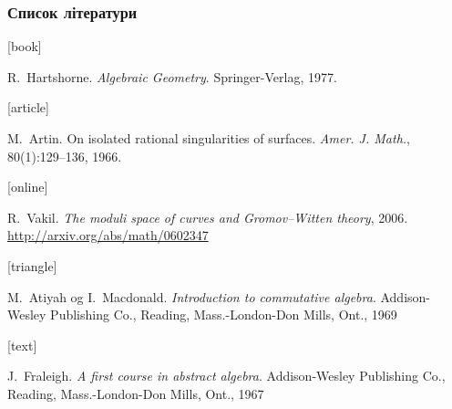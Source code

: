 \documentclass[ukrainian]{beamer}
\begin{document}
\begin{frame}[allowframebreaks]
    \frametitle{Список літератури}

    \begin{thebibliography}{}

        [book]

        R.~Hartshorne.
        \newblock \emph{Algebraic Geometry}.
        \newblock Springer-Verlag, 1977.

        [article]

        M.~Artin.
        \newblock On isolated rational singularities of surfaces.
        \newblock \emph{Amer. J. Math.}, 80(1):129--136, 1966.

        [online]

        R.~Vakil.
        \newblock \emph{The moduli space of curves and Gromov--Witten theory}, 2006.
        \newblock \url{http://arxiv.org/abs/math/0602347}

        [triangle]

        M.~Atiyah og I.~Macdonald.
        \newblock \emph{Introduction to commutative algebra}.
        \newblock Addison-Wesley Publishing Co., Reading, Mass.-London-Don
        Mills, Ont., 1969

        [text]

        J.~Fraleigh.
        \newblock \emph{A first course in abstract algebra}.
        \newblock Addison-Wesley Publishing Co., Reading, Mass.-London-Don Mills, Ont., 1967

    \end{thebibliography}
\end{frame}
\end{document}
